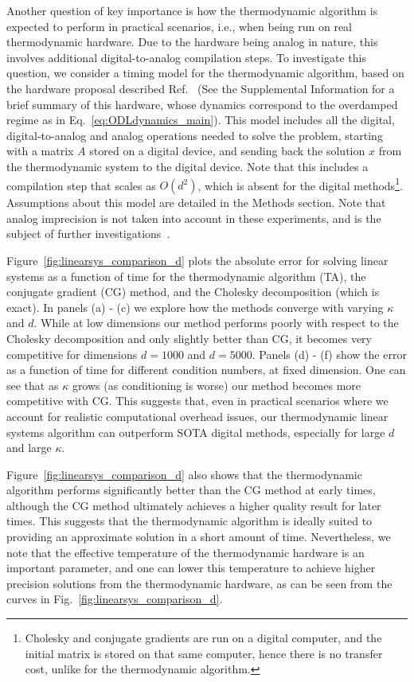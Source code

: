\documentclass[prx,onecolumn,floatfix,longbibliography,notitlepage, nofootinbib,12pt]{revtex4-2}
\begin{document}
Another question of key importance is how the thermodynamic algorithm is expected to perform in practical scenarios, i.e., when being run on real thermodynamic hardware. Due to the hardware being analog in nature, this involves additional digital-to-analog compilation steps. To investigate this question, we consider a timing model for the thermodynamic algorithm, based on the hardware proposal described  Ref.~\cite{coles2023thermodynamic} (See the Supplemental Information for a brief summary of this hardware, whose dynamics correspond to the overdamped regime as in Eq.~\eqref{eq:ODLdynamics_main}). This model includes all the digital, digital-to-analog and analog operations needed to solve the problem, starting with a matrix $A$ stored on a digital device, and sending back the solution $x$ from the thermodynamic system to the digital device. Note that this includes a compilation step that scales as $O(d^2)$, which is absent for the digital methods\footnote{Cholesky and conjugate gradients are run on a digital computer, and the initial matrix is stored on that same computer, hence there is no transfer cost, unlike for the thermodynamic algorithm.}. Assumptions about this model are detailed in the Methods section. Note that analog imprecision is not taken into account in these experiments, and is the subject of further investigations~\cite{aifer2024error}.

Figure~\ref{fig:linearsys_comparison_d} plots the absolute error for solving linear systems as a function of time for the thermodynamic algorithm (TA), the conjugate gradient (CG) method, and the Cholesky decomposition (which is exact). In panels (a) - (c) we explore how the methods converge with varying $\kappa$ and $d$. While at low dimensions our method performs poorly with respect to the Cholesky decomposition and only slightly better than CG, it  becomes very competitive for dimensions $d = 1000$ and $d=5000$. Panels (d) - (f) show the error as a function of time for different condition numbers, at fixed dimension. One can see that as $\kappa$ grows (as conditioning is worse) our method becomes more competitive with CG. This suggests that, even in practical scenarios where we account for realistic computational overhead issues, our thermodynamic linear systems algorithm can outperform SOTA digital methods, especially for large $d$ and large $\kappa$.

Figure~\ref{fig:linearsys_comparison_d} also shows that the thermodynamic algorithm performs significantly better than the CG method at early times, although the CG method ultimately achieves a higher quality result for later times. This suggests that the thermodynamic algorithm is ideally suited to providing an approximate solution in a short amount of time. Nevertheless, we note that the effective temperature of the thermodynamic hardware is an important parameter, and one can lower this temperature to achieve higher precision solutions from the thermodynamic hardware, as can be seen from the curves in Fig.~\ref{fig:linearsys_comparison_d}.
\end{document}

